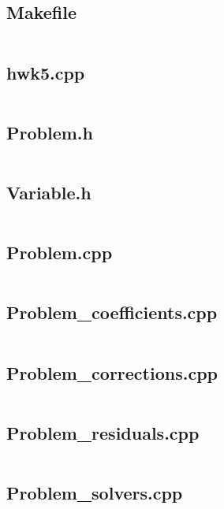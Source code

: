 \documentclass{article}
\begin{document}
\subsection*{Makefile}
\inputminted[fontsize=\scriptsize]{Makefile}{../Makefile}

\subsection*{hwk5.cpp}
\inputminted[fontsize=\scriptsize]{c++}{../hwk5.cpp}

\newpage
\subsection*{Problem.h}
\inputminted[fontsize=\scriptsize]{c++}{../Problem.h}

\newpage
\subsection*{Variable.h}
\inputminted[fontsize=\scriptsize]{c++}{../Variable.h}

\newpage
\subsection*{Problem.cpp}
\inputminted[fontsize=\scriptsize]{c++}{../Problem.cpp}

\newpage
\subsection*{Problem\_coefficients.cpp}
\inputminted[fontsize=\scriptsize]{c++}{../Problem_coefficients.cpp}

\newpage
\subsection*{Problem\_corrections.cpp}
\inputminted[fontsize=\scriptsize]{c++}{../Problem_corrections.cpp}

\newpage
\subsection*{Problem\_residuals.cpp}
\inputminted[fontsize=\scriptsize]{c++}{../Problem_residuals.cpp}

\newpage
\subsection*{Problem\_solvers.cpp}
\inputminted[fontsize=\scriptsize]{c++}{../Problem_solvers.cpp}
\end{document}

